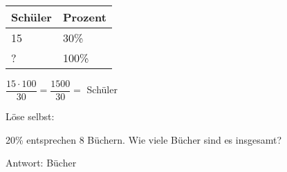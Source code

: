 \begin{enumerate}[label=\arabic*.]
    \begin{tabular}{|l|l|}
        \hline
        Schüler & Prozent \\
        \hline
        15 & 30\% \\
        ? & 100\% \\
        \hline
    \end{tabular}

    $\dfrac{15 \cdot 100}{30} = \dfrac{1500}{30} = $ \underline{\hspace{2cm}} Schüler

    \vspace{0.5cm}

    Löse selbst:

    20\% entsprechen 8 Büchern. Wie viele Bücher sind es insgesamt?

    Antwort: \underline{\hspace{3cm}} Bücher

\end{enumerate}